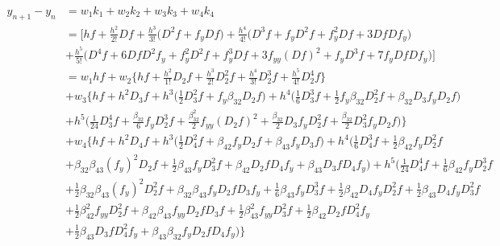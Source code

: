 \documentclass[12 pt]{article}
\begin{document}
	\begin{align*}
		y_{n+1} - y_{n} &= w_{1}k_{1} + w_{2}k_{2} + w_{3}k_{3} + w_{4}k_{4}\\
		&= \bigg[hf + \frac{h^{2}}{2!}Df + \frac{h^{3}}{3!}\bigg(D^{2}f+f_{y}Df\bigg)  + \frac{h^{4}}{4!}\bigg(D^{3}f + f_{y}D^{2}f + f_{y}^{2}Df + 3DfDf_{y}\bigg)\\ 
		&+ \frac{h^{5}}{5!}\bigg(D^{4}f+6DfD^{2}f_{y} + f_{y}^{2}D^{2}f + f_{y}^{3}Df + 3f_{yy}(Df)^{2} + f_{y}D^{3}f + 7f_{y}DfDf_{y}\bigg)\bigg]\\
		&= w_{1}hf + w_{2}\bigg\{hf + \frac{h^{2}}{1!}D_{2}f + \frac{h^{3}}{2!}D_{2}^{2}f + \frac{h^{4}}{3!}D_{2}^{3}f + \frac{h^{5}}{4!}D_{2}^{4}f\bigg\}\\ 
		&+ w_{3}\bigg\{hf + h^{2}D_{3}f + h^{3}\bigg(\frac{1}{2}D_{3}^{2}f + f_{y}\beta_{32}D_{2}f\bigg) + h^{4}\bigg(\frac{1}{6}D_{3}^{3}f + \frac{1}{2}f_{y}\beta_{32}D_{2}^{2}f + \beta_{32}D_{3}f_{y}D_{2}f\bigg) \\
		&+ h^{5}\bigg(\frac{1}{24}D^{4}_{3}f + \frac{\beta_{32}}{6}f_{y}D_{2}^{3}f + \frac{\beta_{32}^{2}}{2}f_{yy}(D_{2}f)^{2} + \frac{\beta_{32}}{2}D_{3}f_{y}D_{2}^{2}f + \frac{\beta_{32}}{2}D_{3}^{2}f_{y}D_{2}f\bigg)\bigg\}\\
		&+ w_{4} \bigg\{hf + h^{2}D_{4}f + h^{3}\bigg(\frac{1}{2}D_{4}^{2}f + \beta_{42}f_{y}D_{2}f + \beta_{43}f_{y}D_{3}f\bigg) + h^{4}\bigg(\frac{1}{6}D^{3}_{4}f + \frac{1}{2}\beta_{42}f_{y}D_{2}^{2}f\\
		&+ \beta_{32}\beta_{43}(f_{y})^{2}D_{2}f + \frac{1}{2}\beta_{43}f_{y}D_{3}^{2}f + \beta_{42}D_{2}fD_{4}f_{y}	+ \beta_{43}D_{3}fD_{4}f_{y}\bigg) +  h^{5}\bigg(\frac{1}{24}D_{4}^{4}f + \frac{1}{6}\beta_{42}f_{y}D_{2}^{3}f\\
		&+\frac{1}{2}\beta_{32}\beta_{43}(f_{y})^{2}D_{2}^{2}f + \beta_{32}\beta_{43}f_{y}D_{2}fD_{3}f_{y} + \frac{1}{6}\beta_{43}f_{y}D_{3}^{3}f + \frac{1}{2}\beta_{42}D_{4}f_{y}D_{2}^{2}f + \frac{1}{2}\beta_{43}D_{4}f_{y}D_{3}^{2}f\\
		&+\frac{1}{2}\beta_{42}^{2}f_{yy}D_{2}^{2}f + \beta_{42}\beta_{43}f_{yy}D_{2}fD_{3}f + \frac{1}{2}\beta_{43}^{2}f_{yy}D_{3}^{2}f + \frac{1}{2}\beta_{42}D_{2}fD_{4}^{2}f_{y}\\
		&+ \frac{1}{2}\beta_{43}D_{3}fD_{4}^{2}f_{y} + \beta_{43}\beta_{32}f_{y}D_{2}fD_{4}f_{y}\bigg)\bigg\}				
	\end{align*}
	
\end{document}
